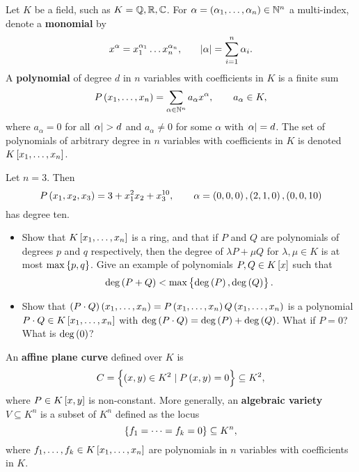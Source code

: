 \pagebreak

\begin{definition}
Let $ K $ be a field, such as $ K = \mathbb{Q}, \mathbb{R}, \mathbb{C} $. For $ \alpha = \br{\alpha_1, \dots, \alpha_n} \in \N^n $ a multi-index, denote a \textbf{monomial} by
$$ x^\alpha = x_1^{\alpha_1} \dots x_n^{\alpha_n}, \qquad \abs{\alpha} = \sum_{i = 1}^n \alpha_i. $$
A \textbf{polynomial} of degree $ d $ in $ n $ variables with coefficients in $ K $ is a finite sum
$$ P\br{x_1, \dots, x_n} = \sum_{\alpha \in \N^n} a_\alpha x^\alpha, \qquad a_\alpha \in K, $$
where $ a_\alpha = 0 $ for all $ \abs{\alpha} > d $ and $ a_\alpha \ne 0 $ for some $ \alpha $ with $ \abs{\alpha} = d $. The set of polynomials of arbitrary degree in $ n $ variables with coefficients in $ K $ is denoted $ K\sbr{x_1, \dots, x_n} $.
\end{definition}

\begin{example*}
Let $ n = 3 $. Then
$$ P\br{x_1, x_2, x_3} = 3 + x_1^2x_2 + x_3^{10}, \qquad \alpha = \br{0, 0, 0}, \br{2, 1, 0}, \br{0, 0, 10} $$
has degree ten.
\end{example*}

\begin{exercise}
\hfill
\begin{itemize}
\item Show that $ K\sbr{x_1, \dots, x_n} $ is a ring, and that if $ P $ and $ Q $ are polynomials of degrees $ p $ and $ q $ respectively, then the degree of $ \lambda P + \mu Q $ for $ \lambda, \mu \in K $ is at most $ \max\cbr{p, q} $. Give an example of polynomials $ P, Q \in K\sbr{x} $ such that
$$ \deg\br{P + Q} < \max\cbr{\deg\br{P}, \deg\br{Q}}. $$
\item Show that $ \br{P \cdot Q}\br{x_1, \dots, x_n} = P\br{x_1, \dots, x_n}Q\br{x_1, \dots, x_n} $ is a polynomial $ P \cdot Q \in K\sbr{x_1, \dots, x_n} $ with $ \deg\br{P \cdot Q} = \deg\br{P} + \deg\br{Q} $. What if $ P = 0 $? What is $ \deg\br{0} $?
\end{itemize}
\end{exercise}

\begin{definition}
An \textbf{affine plane curve} defined over $ K $ is
$$ C = \cbr{\br{x, y} \in K^2 \mid P\br{x, y} = 0} \subseteq K^2, $$
where $ P \in K\sbr{x, y} $ is non-constant. More generally, an \textbf{algebraic variety} $ V \subseteq K^n $ is a subset of $ K^n $ defined as the locus
$$ \cbr{f_1 = \dots = f_k = 0} \subseteq K^n, $$
where $ f_1, \dots, f_k \in K\sbr{x_1, \dots, x_n} $ are polynomials in $ n $ variables with coefficients in $ K $.
\end{definition}

